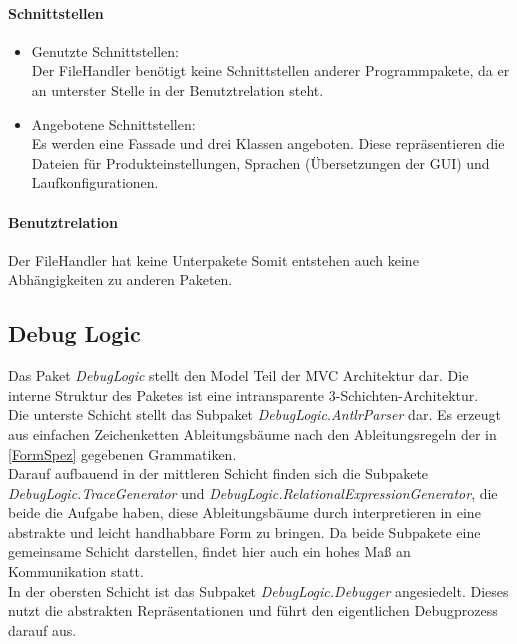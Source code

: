 \documentclass[parskip=full]{scrartcl}
\begin{document}
\paragraph{Schnittstellen}
\begin{itemize}
\item Genutzte Schnittstellen: \\
Der FileHandler benötigt keine Schnittstellen anderer Programmpakete, da er an unterster Stelle in der Benutztrelation steht.
\item Angebotene Schnittstellen: \\
Es werden eine Fassade und drei Klassen angeboten.
Diese repräsentieren die Dateien für Produkteinstellungen, Sprachen (Übersetzungen der GUI) und Laufkonfigurationen.

\end{itemize}
\paragraph{Benutztrelation}
Der FileHandler hat keine Unterpakete
Somit entstehen auch keine Abhängigkeiten zu anderen Paketen.

\subsection{Debug Logic}
Das Paket \textit{DebugLogic} stellt den Model Teil der MVC Architektur dar. Die interne Struktur des Paketes ist eine intransparente 3-Schichten-Architektur.\\
Die unterste Schicht stellt das Subpaket \textit{DebugLogic.AntlrParser} dar. Es erzeugt aus einfachen Zeichenketten Ableitungsbäume nach den Ableitungsregeln der in \ref{FormSpez} gegebenen Grammatiken.\\ Darauf aufbauend in der mittleren Schicht finden sich die Subpakete \textit{DebugLogic.TraceGenerator} und \textit{DebugLogic.RelationalExpressionGenerator}, die beide die Aufgabe haben, diese Ableitungsbäume durch interpretieren in eine abstrakte und leicht handhabbare Form zu bringen. Da beide Subpakete eine gemeinsame Schicht darstellen, findet hier auch ein hohes Maß an Kommunikation statt. \\ In der obersten Schicht ist das Subpaket \textit{DebugLogic.Debugger} angesiedelt. Dieses nutzt die abstrakten Repräsentationen und führt den eigentlichen Debugprozess darauf aus.
\end{document}
